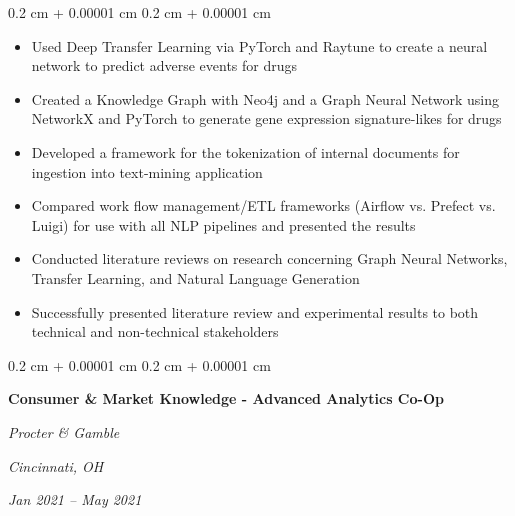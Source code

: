 \documentclass[10pt, letterpaper]{article}
\newenvironment{highlights}{
    \begin{itemize}[
        topsep=0.10 cm,
        parsep=0.10 cm,
        partopsep=0pt,
        itemsep=0pt,
        leftmargin=0.4 cm + 10pt
    ]
}{
    \end{itemize}
} %
\newenvironment{onecolentry}{
    \begin{adjustwidth}{
        0.2 cm + 0.00001 cm
    }{
        0.2 cm + 0.00001 cm
    }
}{
    \end{adjustwidth}
} %
\newenvironment{twocolentry}[2][]{
    \onecolentry
    \def\secondColumn{#2}
    \setcolumnwidth{\fill, 4.5 cm}
    \begin{paracol}{2}
}{
    \switchcolumn \raggedleft \secondColumn
    \end{paracol}
    \endonecolentry
} %
\begin{document}
        \vspace{0.10 cm}
        \begin{onecolentry}
            \begin{highlights}
                \item Used Deep Transfer Learning via PyTorch and Raytune to create a neural network to predict adverse events for drugs
                \item Created a Knowledge Graph with Neo4j and a Graph Neural Network using NetworkX and PyTorch to generate gene expression signature-likes for drugs
                \item Developed a framework for the tokenization of internal documents for ingestion into text-mining application
                \item Compared work flow management/ETL frameworks (Airflow vs. Prefect vs. Luigi) for use with all NLP pipelines and presented the results
                \item Conducted literature reviews on research concerning Graph Neural Networks, Transfer Learning, and Natural Language Generation
                \item Successfully presented literature review and experimental results to both technical and non-technical stakeholders
            \end{highlights}
        \end{onecolentry}


        \vspace{0.2 cm}

        \begin{twocolentry}{
        \textit{Cincinnati, OH}    
            
        \textit{Jan 2021 – May 2021}}
            \textbf{Consumer \& Market Knowledge - Advanced Analytics Co-Op}
            
            \textit{Procter \& Gamble}
        \end{twocolentry}
\end{document}
